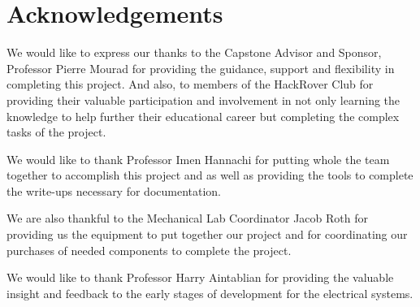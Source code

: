 \documentclass[a4paper, 10pt]{article}
\begin{document}
\section{Acknowledgements}

	We would like to express our thanks to the Capstone Advisor and Sponsor, Professor Pierre Mourad for providing the guidance, support and flexibility in completing this project. And also, to members of the HackRover Club for providing their valuable participation and involvement in not only learning the knowledge to help further their educational career but completing the complex tasks of the project.
	
	We would like to thank Professor Imen Hannachi for putting whole the team together to accomplish this project and as well as providing the tools to complete the write-ups necessary for documentation.
	
	We are also thankful to the Mechanical Lab Coordinator Jacob Roth for providing us the equipment to put together our project and for coordinating our purchases of needed components to complete the project.
	
	We would like to thank Professor Harry Aintablian for providing the valuable insight and feedback to the early stages of development for the electrical systems. 
\end{document}
